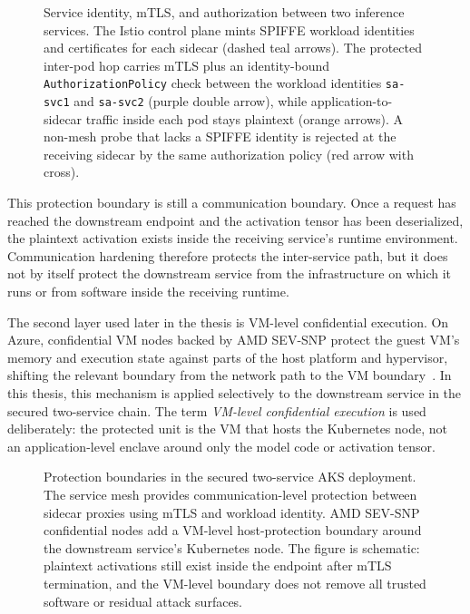 \begin{figure}[htbp]
\centering
%
\caption[Service identity, mTLS, and authorization]{Service identity, mTLS, and authorization between two inference
services. The Istio control plane mints SPIFFE workload identities and
certificates for each sidecar (dashed teal arrows). The protected inter-pod hop
carries mTLS plus an identity-bound \texttt{AuthorizationPolicy} check between
the workload identities \texttt{sa-svc1} and \texttt{sa-svc2} (purple double
arrow), while application-to-sidecar traffic inside each pod stays plaintext
(orange arrows). A non-mesh probe that lacks a SPIFFE identity is rejected at
the receiving sidecar by the same authorization policy (red arrow with cross).}
\label{fig:rq21_mtls_identity_authz}
\end{figure}

This protection boundary is still a communication boundary. Once a request has reached
the downstream endpoint and the activation tensor has been deserialized, the plaintext
activation exists inside the receiving service's runtime environment. Communication
hardening therefore protects the inter-service path, but it does not by itself protect
the downstream service from the infrastructure on which it runs or from software inside
the receiving runtime.

The second layer used later in the thesis is VM-level confidential execution. On Azure,
confidential VM nodes backed by AMD SEV-SNP protect the guest VM's memory and execution
state against parts of the host platform and hypervisor, shifting the relevant boundary
from the network path to the VM boundary~\cite{amd_sevsnp_whitepaper}. In this thesis,
this mechanism is applied selectively to the downstream service in the secured two-service
chain. The term \emph{VM-level confidential execution} is used deliberately: the
protected unit is the VM that hosts the Kubernetes node, not an application-level enclave
around only the model code or activation tensor.

\begin{figure}[htbp]
\centering
%
\caption[Protection boundaries in the secured AKS deployment]{Protection boundaries in the secured two-service AKS deployment. The service
mesh provides communication-level protection between sidecar proxies using mTLS and
workload identity. AMD SEV-SNP confidential nodes add a VM-level host-protection boundary
around the downstream service's Kubernetes node. The figure is schematic: plaintext
activations still exist inside the endpoint after mTLS termination, and the VM-level
boundary does not remove all trusted software or residual attack surfaces.}
\label{fig:confidential_vm_boundary}
\end{figure}

